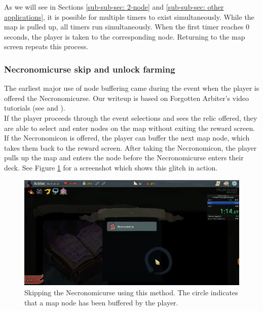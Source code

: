 \documentclass[12pt]{amsart}
\begin{document}
As we will see in Sections \ref{sub-sub-sec: 2-node} and \ref{sub-sub-sec: other applications}, it is possible for multiple timers to exist simultaneously.  
While the map is pulled up, all timers run simultaneously.  
When the first timer reaches $0$ seconds, the player is taken to the corresponding node.  
Returning to the map screen repeats this process.  
\\

\subsubsection{Necronomicurse skip and unlock farming}
The earliest major use of node buffering came during the  event when the player is offered the Necronomicurse.  
Our writeup is based on Forgotten Arbiter's video tutorials (see \cite{ForgottenArbiterGlitches} and  \cite{ForgottenArbiterMoreGlitches}).  \\

If the player proceeds through the event selections and sees the relic offered, they are able to select and enter nodes on the map without exiting the reward screen.  
If the Necronomicon is offered, the player can buffer the next map node, which takes them back to the reward screen.  
After taking the Necronomicon, the player pulls up the map and enters the node before the Necronomicurse enters their deck.  
See Figure \ref{fig: necro skip} for a screenshot which shows this glitch in action.  
\begin{figure}[h]
    \centering
    \includegraphics[scale = .3]{graphics/NecronomicurseSkip.png}
    \caption{Skipping the Necronomicurse using this method.  
    The circle indicates that a map node has been buffered by the player.  
    }
    \label{fig: necro skip}
\end{figure}
\\
\end{document}
